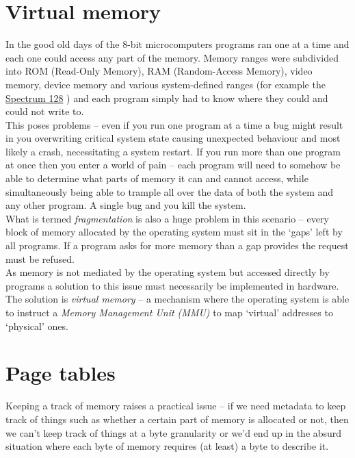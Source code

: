 \section{Virtual memory}

In the good old days of the 8-bit microcomputers programs ran one at a time and
each one could access any part of the memory. Memory ranges were subdivided into
ROM (Read-Only Memory), RAM (Random-Access Memory), video memory, device memory
and various system-defined ranges (for example the
\href{https://worldofspectrum.org/ZXSpectrum128+3Manual/chapter8pt24.html}{Spectrum
  128} \autocite{spectrum128-manual:c8pt24}) and each program simply had to know
where they could and could not write to.\\

This poses problems -- even if you run one program at a time a bug might result in
you overwriting critical system state causing unexpected behaviour and most
likely a crash, necessitating a system restart. If you run more than one program
at once then you enter a world of pain -- each program will need to somehow be
able to determine what parts of memory it can and cannot access, while
simultaneously being able to trample all over the data of both the system and
any other program. A single bug and you kill the system.\\

What is termed \emph{fragmentation} is also a huge problem in this scenario --
every block of memory allocated by the operating system must sit in the `gaps'
left by all programs. If a program asks for more memory than a gap provides the
request must be refused.\\

As memory is not mediated by the operating system but accessed directly by
programs a solution to this issue must necessarily be implemented in
hardware. The solution is \emph{virtual memory} -- a mechanism where the
operating system is able to instruct a \emph{Memory Management Unit (MMU)} to
map `virtual' addresses to `physical' ones.\\

\section{Page tables}
Keeping a track of memory raises a practical issue -- if we need metadata to
keep track of things such as whether a certain part of memory is allocated or
not, then we can't keep track of things at a byte granularity or we'd end up in
the absurd situation where each byte of memory requires (at least) a byte to
describe it.\\

